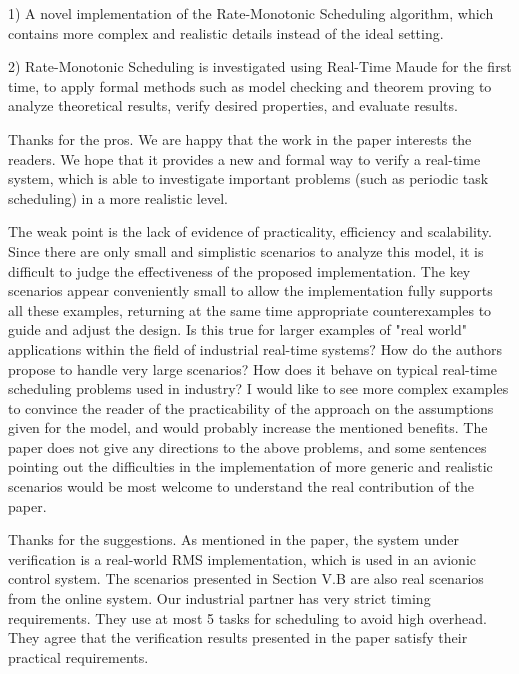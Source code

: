 \documentclass[10pt,journal]{IEEEtran}
\newcommand{\ANSWER}{\medskip\noindent{\bf RESPONSE: }}
\newcommand{\COMMENT}{\medskip\noindent{\bf COMMENT: }}
\begin{document}
1) A novel implementation of the Rate-Monotonic Scheduling algorithm,
which contains more complex and realistic details instead of the ideal
setting.

2) Rate-Monotonic Scheduling is investigated using Real-Time Maude for
the first time, to apply formal methods such as model checking and
theorem proving to analyze theoretical results, verify desired
properties, and evaluate results.

\ANSWER 

Thanks for the pros. We are happy that the work in the paper interests
the readers. We hope that it provides a new and formal way to verify a
real-time system, which is able to investigate important problems
(such as periodic task scheduling) in a more realistic level.

\COMMENT 

The weak point is the lack of evidence of practicality, efficiency and
scalability. Since there are only small and simplistic scenarios to
analyze this model, it is difficult to judge the effectiveness of the
proposed implementation. The key scenarios appear conveniently small
to allow the implementation fully supports all these examples,
returning at the same time appropriate counterexamples to guide and
adjust the design. Is this true for larger examples of "real world"
applications within the field of industrial real-time systems? How do
the authors propose to handle very large scenarios?  How does it
behave on typical real-time scheduling problems used in industry? I
would like to see more complex examples to convince the reader of the
practicability of the approach on the assumptions given for the model,
and would probably increase the mentioned benefits. The paper does not
give any directions to the above problems, and some sentences pointing
out the difficulties in the implementation of more generic and
realistic scenarios would be most welcome to understand the real
contribution of the paper.

\ANSWER 

Thanks for the suggestions. As mentioned in the paper, the system
under verification is a real-world RMS implementation, which is used
in an avionic control system. The scenarios presented in Section V.B
are also real scenarios from the online system. Our industrial partner
has very strict timing requirements. They use at most 5 tasks for
scheduling to avoid high overhead. They agree that the verification
results presented in the paper satisfy their practical requirements.
\end{document}
